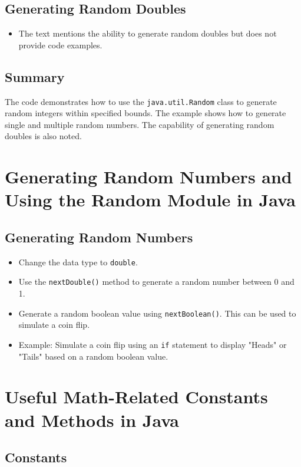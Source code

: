 \documentclass{article}
\begin{document}
\subsection{Generating Random Doubles}

\begin{itemize}
    \item The text mentions the ability to generate random doubles but does not provide code examples.
\end{itemize}

\subsection{Summary}
The code demonstrates how to use the \texttt{java.util.Random} class to generate random integers within specified bounds.  The example shows how to generate single and multiple random numbers.  The capability of generating random doubles is also noted.


\section{Generating Random Numbers and Using the Random Module in Java}

\subsection{Generating Random Numbers}

\begin{itemize}
    \item Change the data type to \texttt{double}.
    \item Use the \texttt{nextDouble()} method to generate a random number between 0 and 1.
    \item Generate a random boolean value using \texttt{nextBoolean()}.  This can be used to simulate a coin flip.
    \item Example:  Simulate a coin flip using an \texttt{if} statement to display "Heads" or "Tails" based on a random boolean value.
\end{itemize}

\section{Useful Math-Related Constants and Methods in Java}

\subsection{Constants}
\end{document}
